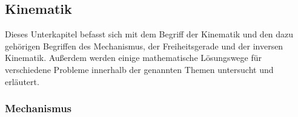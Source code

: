 \subsection{Kinematik }
\label{sec:basics-ik}
    
Dieses Unterkapitel befasst sich mit dem Begriff der Kinematik und den dazu gehörigen Begriffen des Mechanismus, der Freiheitsgerade und der inversen Kinematik. Außerdem werden einige mathematische Lösungswege für verschiedene Probleme innerhalb der genannten Themen untersucht und erläutert.

\subsubsection{Mechanismus}


